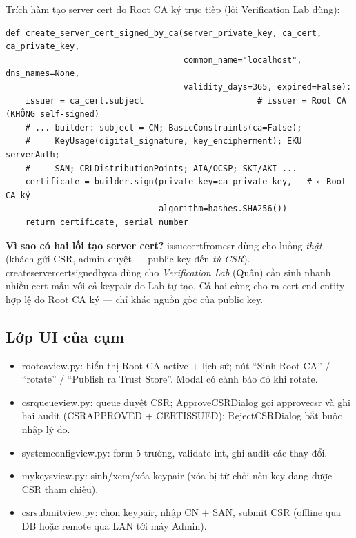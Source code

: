 \documentclass[12pt,a4paper]{article}
\newcommand{\code}[1]{{\ttfamily\small\def\_{\textunderscore\discretionary{}{}{}}#1}}
\begin{document}
Trích hàm tạo server cert do Root CA ký trực tiếp (lối Verification Lab dùng):

\begin{Verbatim}
def create_server_cert_signed_by_ca(server_private_key, ca_cert, ca_private_key,
                                    common_name="localhost", dns_names=None,
                                    validity_days=365, expired=False):
    issuer = ca_cert.subject                       # issuer = Root CA (KHÔNG self-signed)
    # ... builder: subject = CN; BasicConstraints(ca=False);
    #     KeyUsage(digital_signature, key_encipherment); EKU serverAuth;
    #     SAN; CRLDistributionPoints; AIA/OCSP; SKI/AKI ...
    certificate = builder.sign(private_key=ca_private_key,   # ← Root CA ký
                               algorithm=hashes.SHA256())
    return certificate, serial_number
\end{Verbatim}

\begin{notebox}
\textbf{Vì sao có hai lối tạo server cert?} \code{issue\_cert\_from\_csr} dùng cho
luồng \emph{thật} (khách gửi CSR, admin duyệt --- public key đến \emph{từ CSR}).
\code{create\_server\_cert\_signed\_by\_ca} dùng cho \emph{Verification Lab}
(Quân) cần sinh nhanh nhiều cert mẫu với cả keypair do Lab tự tạo. Cả hai cùng
cho ra cert end-entity hợp lệ do Root CA ký --- chỉ khác nguồn gốc của public key.
\end{notebox}

\subsection{Lớp UI của cụm}

\begin{itemize}
  \item \code{root\_ca\_view.py}: hiển thị Root CA active + lịch sử; nút
        \enquote{Sinh Root CA} / \enquote{rotate} / \enquote{Publish ra Trust
        Store}. Modal có cảnh báo đỏ khi rotate.
  \item \code{csr\_queue\_view.py}: queue duyệt CSR; \code{ApproveCSRDialog} gọi
        \code{approve\_csr} và ghi hai audit (\code{CSR\_APPROVED} +
        \code{CERT\_ISSUED}); \code{RejectCSRDialog} bắt buộc nhập lý do.
  \item \code{system\_config\_view.py}: form 5 trường, validate int, ghi audit
        các thay đổi.
  \item \code{my\_keys\_view.py}: sinh/xem/xóa keypair (xóa bị từ chối nếu key
        đang được CSR tham chiếu).
  \item \code{csr\_submit\_view.py}: chọn keypair, nhập CN + SAN, submit CSR
        (offline qua DB hoặc remote qua LAN tới máy Admin).
\end{itemize}
\end{document}
